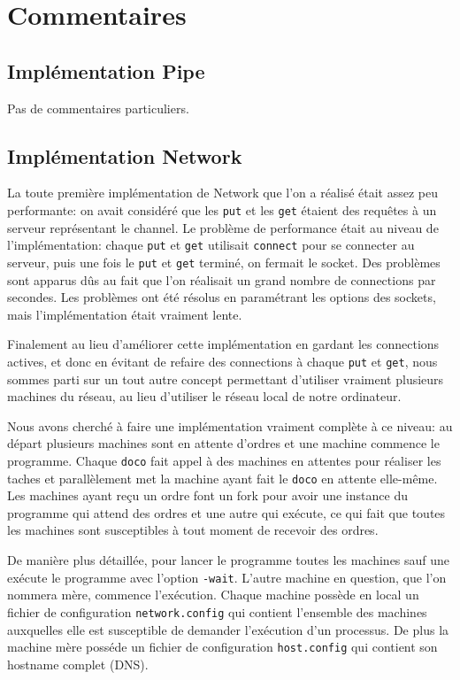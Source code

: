 \documentclass[a4paper]{article}
\begin{document}
\section{Commentaires}

\subsection{Implémentation Pipe}
Pas de commentaires particuliers.

\subsection{Implémentation Network}
La toute première implémentation de Network que l'on a réalisé était assez
peu performante: on avait considéré que les \verb!put! et les \verb!get! étaient des
requêtes à un serveur représentant le channel. Le problème de performance
était au niveau de l'implémentation: chaque \verb!put! et \verb!get! utilisait
\verb!connect! pour se connecter au serveur, puis une fois le \verb!put! et \verb!get!
terminé, on fermait le socket. Des problèmes sont apparus dûs au fait que l'on réalisait
un grand nombre de connections par secondes. Les problèmes ont été résolus
en paramétrant les options des sockets,
mais l'implémentation était vraiment lente.

Finalement au lieu d'améliorer cette implémentation en gardant les
connections actives, et donc en évitant de refaire des connections à chaque
\verb!put! et \verb!get!, nous sommes parti sur un tout autre concept permettant
d'utiliser vraiment plusieurs machines du réseau, au lieu d'utiliser le
réseau local de notre ordinateur.

Nous avons cherché à faire une implémentation vraiment complète à ce
niveau: au départ plusieurs machines sont en attente d'ordres et une machine
commence le programme. Chaque \verb!doco! fait appel à des machines en
attentes pour réaliser les taches et parallèlement met la machine ayant fait le
\verb!doco! en attente elle-même. Les machines ayant reçu un ordre font un
fork pour avoir une instance du programme qui attend des ordres et une
autre qui exécute, ce qui fait que toutes les machines sont susceptibles à
tout moment de recevoir des ordres.

De manière plus détaillée, pour lancer le programme toutes les machines
sauf une exécute le programme avec l'option \verb!-wait!. L'autre machine
en question, que l'on nommera mère, commence l'exécution.
Chaque machine possède en local un fichier de configuration
\verb!network.config! qui contient l'ensemble des machines auxquelles elle
est susceptible de demander l'exécution d'un processus. De plus la machine
mère posséde un fichier de configuration \verb!host.config! qui contient
son hostname complet (DNS).
\end{document}
